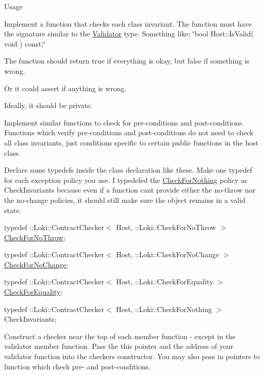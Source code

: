 \begin{DoxyParagraph}{Usage}

\begin{DoxyEnumerate}
\item Implement a function that checks each class invariant. The function must have the signature similar to the \hyperlink{structValidator}{Validator} type. Something like\+: \char`\"{}bool Host\+::\+Is\+Valid( void ) const;\char`\"{}
\begin{DoxyItemize}
\item The function should return true if everything is okay, but false if something is wrong.
\item Or it could assert if anything is wrong.
\item Ideally, it should be private.
\end{DoxyItemize}
\item Implement similar functions to check for pre-\/conditions and post-\/conditions. Functions which verify pre-\/conditions and post-\/conditions do not need to check all class invariants, just conditions specific to certain public functions in the host class.
\item Declare some typedef\textquotesingle{}s inside the class declaration like these. Make one typedef for each exception policy you use. I typedef\textquotesingle{}ed the \hyperlink{classLoki_1_1CheckForNothing}{Check\+For\+Nothing} policy as Check\+Invariants because even if a function can\textquotesingle{}t provide either the no-\/throw nor the no-\/change policies, it should still make sure the object remains in a valid state.
\begin{DoxyItemize}
\item typedef \+::\+Loki\+::\+Contract\+Checker$<$ Host, \+::\+Loki\+::\+Check\+For\+No\+Throw  $>$ \hyperlink{classLoki_1_1CheckForNoThrow}{Check\+For\+No\+Throw};
\item typedef \+::\+Loki\+::\+Contract\+Checker$<$ Host, \+::\+Loki\+::\+Check\+For\+No\+Change $>$ \hyperlink{classLoki_1_1CheckForNoChange}{Check\+For\+No\+Change};
\item typedef \+::\+Loki\+::\+Contract\+Checker$<$ Host, \+::\+Loki\+::\+Check\+For\+Equality $>$ \hyperlink{classLoki_1_1CheckForEquality}{Check\+For\+Equality};
\item typedef \+::\+Loki\+::\+Contract\+Checker$<$ Host, \+::\+Loki\+::\+Check\+For\+Nothing  $>$ Check\+Invariants;
\end{DoxyItemize}
\item Construct a checker near the top of each member function -\/ except in the validator member function. Pass the this pointer and the address of your validator function into the checker\textquotesingle{}s constructor. You may also pass in pointers to function which check pre-\/ and post-\/conditions.

\end{DoxyEnumerate}
\end{DoxyParagraph}
